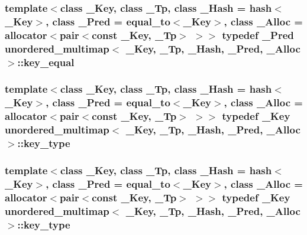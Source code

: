 \subsubsection[{key\+\_\+equal}]{\setlength{\rightskip}{0pt plus 5cm}template$<$class \+\_\+\+Key, class \+\_\+\+Tp, class \+\_\+\+Hash = hash$<$\+\_\+\+Key$>$, class \+\_\+\+Pred = equal\+\_\+to$<$\+\_\+\+Key$>$, class \+\_\+\+Alloc = allocator$<$pair$<$const \+\_\+\+Key, \+\_\+\+Tp$>$ $>$$>$ typedef \+\_\+\+Pred {\bf unordered\+\_\+multimap}$<$ \+\_\+\+Key, \+\_\+\+Tp, \+\_\+\+Hash, \+\_\+\+Pred, \+\_\+\+Alloc $>$\+::{\bf key\+\_\+equal}}\label{classunordered__multimap_aeed817e3baaf0771b8336eb2477f4f02}
\hypertarget{classunordered__multimap_a2902747087a03531493d30e9840f67d9}{}
\subsubsection[{key\+\_\+type}]{\setlength{\rightskip}{0pt plus 5cm}template$<$class \+\_\+\+Key, class \+\_\+\+Tp, class \+\_\+\+Hash = hash$<$\+\_\+\+Key$>$, class \+\_\+\+Pred = equal\+\_\+to$<$\+\_\+\+Key$>$, class \+\_\+\+Alloc = allocator$<$pair$<$const \+\_\+\+Key, \+\_\+\+Tp$>$ $>$$>$ typedef \+\_\+\+Key {\bf unordered\+\_\+multimap}$<$ \+\_\+\+Key, \+\_\+\+Tp, \+\_\+\+Hash, \+\_\+\+Pred, \+\_\+\+Alloc $>$\+::{\bf key\+\_\+type}}\label{classunordered__multimap_a2902747087a03531493d30e9840f67d9}
\hypertarget{classunordered__multimap_a2902747087a03531493d30e9840f67d9}{}
\subsubsection[{key\+\_\+type}]{\setlength{\rightskip}{0pt plus 5cm}template$<$class \+\_\+\+Key, class \+\_\+\+Tp, class \+\_\+\+Hash = hash$<$\+\_\+\+Key$>$, class \+\_\+\+Pred = equal\+\_\+to$<$\+\_\+\+Key$>$, class \+\_\+\+Alloc = allocator$<$pair$<$const \+\_\+\+Key, \+\_\+\+Tp$>$ $>$$>$ typedef \+\_\+\+Key {\bf unordered\+\_\+multimap}$<$ \+\_\+\+Key, \+\_\+\+Tp, \+\_\+\+Hash, \+\_\+\+Pred, \+\_\+\+Alloc $>$\+::{\bf key\+\_\+type}}\label{classunordered__multimap_a2902747087a03531493d30e9840f67d9}
\hypertarget{classunordered__multimap_a672fd63d94f807d130e2026d2863d40c}{}
